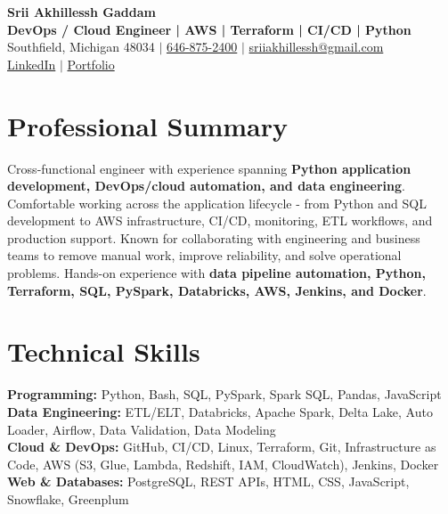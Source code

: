 \documentclass[letterpaper,10pt]{article}
\begin{document}
\fontsize{9.35pt}{10.45pt}\selectfont

\begin{center}
    {\LARGE \textbf{Srii Akhillessh Gaddam}} \\[-1pt]
    \textbf{DevOps / Cloud Engineer | AWS | Terraform | CI/CD | Python} \\[2pt]
    Southfield, Michigan 48034 $|$
    \href{tel:6468752400}{646-875-2400} $|$
    \href{mailto:sriiakhillessh@gmail.com}{sriiakhillessh@gmail.com} \\[1pt]
    \href{https://www.linkedin.com/in/srii-akhiilessh-gaddam-b48668191/}{LinkedIn} $|$
    \href{https://sriiakhillesshg.github.io/portfolio/}{Portfolio}
\end{center}
\vspace{-8pt}

\section{Professional Summary}
\small{Cross-functional engineer with experience spanning \textbf{Python application development, DevOps/cloud automation, and data engineering}. Comfortable working across the application lifecycle - from Python and SQL development to AWS infrastructure, CI/CD, monitoring, ETL workflows, and production support. Known for collaborating with engineering and business teams to remove manual work, improve reliability, and solve operational problems. Hands-on experience with \textbf{data pipeline automation, Python, Terraform, SQL, PySpark, Databricks, AWS, Jenkins, and Docker}.}

\section{Technical Skills}
\small{
\textbf{Programming:} Python, Bash, SQL, PySpark, Spark SQL, Pandas, JavaScript \\
\textbf{Data Engineering:} ETL/ELT, Databricks, Apache Spark, Delta Lake, Auto Loader, Airflow, Data Validation, Data Modeling \\
\textbf{Cloud \& DevOps:} GitHub, CI/CD, Linux, Terraform, Git, Infrastructure as Code, AWS (S3, Glue, Lambda, Redshift, IAM, CloudWatch), Jenkins, Docker \\
\textbf{Web \& Databases:} PostgreSQL, REST APIs, HTML, CSS, JavaScript, Snowflake, Greenplum
}
\end{document}
